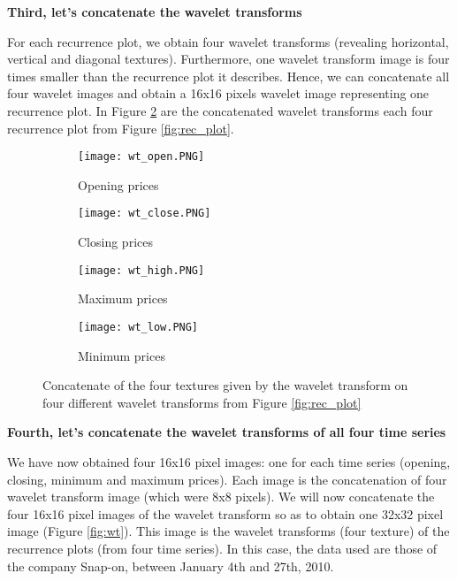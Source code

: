 \documentclass[11pt]{article}
\begin{document}
\begin{onehalfspace}
\noindent \textbf{Third, let's concatenate the wavelet transforms }

For each recurrence plot, we obtain four wavelet transforms (revealing horizontal, vertical and diagonal textures). Furthermore, one wavelet transform image is four times smaller than the recurrence plot it describes. Hence, we can concatenate all four wavelet images and obtain a 16x16 pixels wavelet image representing one recurrence plot. In Figure \ref{fig:wave_concat} are the concatenated wavelet transforms each four recurrence plot from Figure \ref{fig:rec_plot}. 

\begin{figure}[h!]
    \centering
    \captionsetup{justification=centering}
    \begin{subfigure}{0.24\textwidth}
        \texttt{[image: wt\_open.PNG]}
        \caption{Opening prices}
        \label{fig:open_concat}
    \end{subfigure}
    \begin{subfigure}{0.24\textwidth}
        \texttt{[image: wt\_close.PNG]}
        \caption{Closing prices}
    \end{subfigure}
    \begin{subfigure}{0.24\textwidth}
        \texttt{[image: wt\_high.PNG]}
        \caption{Maximum prices}
    \end{subfigure}    
    \begin{subfigure}{0.24\textwidth}
        \texttt{[image: wt\_low.PNG]}
        \caption{Minimum prices}
    \end{subfigure}
    \caption{Concatenate of the four textures given by the wavelet transform on four different wavelet transforms from Figure \ref{fig:rec_plot}}
    \label{fig:wave_concat}
\end{figure}

\noindent \textbf{Fourth, let's concatenate the wavelet transforms of all four time series }

We have now obtained four 16x16 pixel images: one for each time series (opening, closing, minimum and maximum prices). Each image is the concatenation of four wavelet transform image (which were 8x8 pixels). We will now concatenate the four 16x16 pixel images of the wavelet transform so as to obtain one 32x32 pixel image (Figure \ref{fig:wt}). This image is the wavelet transforms (four texture) of the recurrence plots (from four time series). In this case, the data used are those of the company Snap-on, between January 4th and 27th, 2010. 


\end{onehalfspace}
\end{document}
